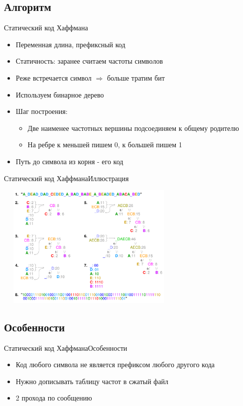 \documentclass[10pt]{beamer}
\begin{document}
\subsection{Алгоритм}
\begin{frame}[fragile]{Статический код Хаффмана}
\begin{itemize}
    \item Переменная длина, префиксный код
    \item Статичность: заранее считаем частоты символов
    \item Реже встречается символ $\Rightarrow$ больше тратим бит
    \item Используем бинарное дерево
    \item Шаг построения:
    \begin{itemize}
        \item Две наименее частотных вершины подсоединяем к общему родителю
        \item На ребре к меньшей пишем 0, к большей пишем 1
    \end{itemize}
    \item Путь до символа из корня - его код
\end{itemize}
\end{frame}

\begin{frame}[fragile]{Статический код Хаффмана}{Иллюстрация}
\begin{center}
    \includegraphics[width=9cm, height=6cm]{Term_1/Source/Pirctures/huffman_big.png}
\end{center}
\end{frame}

\subsection{Особенности}
\begin{frame}[fragile]{Статический код Хаффмана}{Особенности}
\begin{itemize}
    \item Код любого символа не является префиксом любого другого кода
    \item Нужно дописывать таблицу частот в сжатый файл
    \item 2 прохода по сообщению
\end{itemize}
\end{frame}
\end{document}
